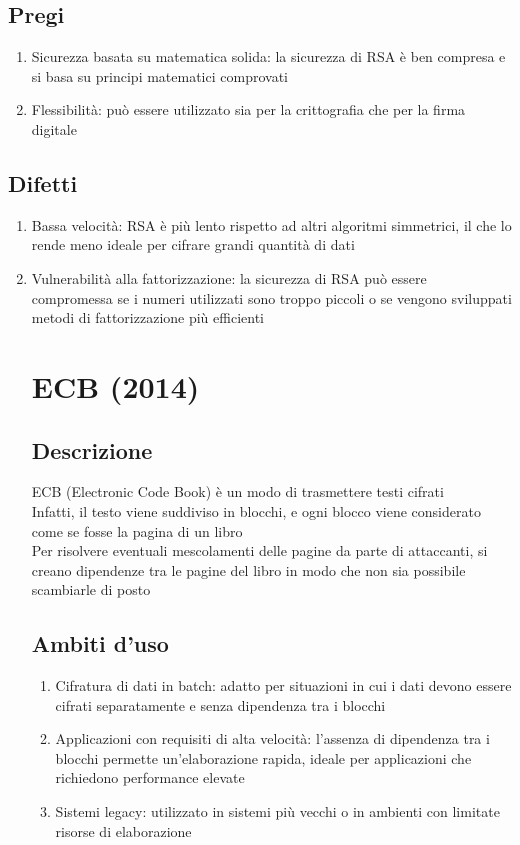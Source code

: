 \documentclass[10pt,oneside,a4paper]{article}
\begin{document}
\subsection{Pregi}
\begin{enumerate}
\item Sicurezza basata su matematica solida: la sicurezza di RSA è ben compresa e si basa su principi matematici comprovati
\item Flessibilità: può essere utilizzato sia per la crittografia che per la firma digitale
\end{enumerate}
\subsection{Difetti}
\begin{enumerate}
\item Bassa velocità: RSA è più lento rispetto ad altri algoritmi simmetrici, il che lo rende meno ideale per cifrare grandi quantità di dati
\item Vulnerabilità alla fattorizzazione: la sicurezza di RSA può essere compromessa se i numeri utilizzati sono troppo piccoli o se vengono sviluppati metodi di fattorizzazione più efficienti
\section{ECB (2014)}
\subsection{Descrizione}
ECB (Electronic Code Book) è un modo di trasmettere testi cifrati\\
Infatti, il testo viene suddiviso in blocchi, e ogni blocco viene considerato come se fosse la pagina di un libro\\
Per risolvere eventuali mescolamenti delle pagine da parte di attaccanti, si creano dipendenze tra le pagine del libro in modo che non sia possibile scambiarle di posto
\subsection{Ambiti d'uso}
\begin{enumerate}
\item Cifratura di dati in batch: adatto per situazioni in cui i dati devono essere cifrati separatamente e senza dipendenza tra i blocchi
\item Applicazioni con requisiti di alta velocità: l'assenza di dipendenza tra i blocchi permette un'elaborazione rapida, ideale per applicazioni che richiedono performance elevate
\item Sistemi legacy: utilizzato in sistemi più vecchi o in ambienti con limitate risorse di elaborazione
\end{enumerate}

\end{enumerate}
\end{document}
